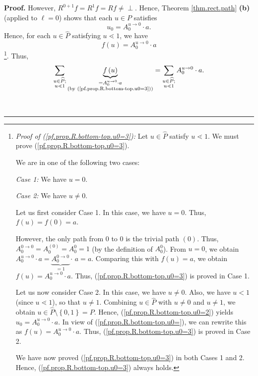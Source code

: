 \documentclass[numbers=enddot,12pt,final,onecolumn,notitlepage]{scrartcl}%
\theoremstyle{definition}
\newenvironment{verlong}{}{}
\newcommand{\undf}{\operatorname*{\bot}}
\newcommand{\downslack}{A}
\newenvironment{proof}[1][Proof]{\noindent\textbf{#1.} }{\ \rule{0.5em}{0.5em}}
\let\sumnonlimits\sum
\renewcommand{\sum}{\sumnonlimits\limits}
\begin{document}
\begin{verlong}
\begin{proof}
However, $R^{0+1}f=R^{1}f=Rf\neq\undf$. Hence, Theorem \ref{thm.rect.path}
\textbf{(b)} (applied to $\ell=0$) shows that each $u\in P$ satisfies%
\begin{equation}
u_{0}=\downslack_{0}^{u\rightarrow0}\cdot a. \label{pf.prop.R.bottom-top.u0=2}%
\end{equation}
Hence, for each $u\in\widehat{P}$ satisfying $u\lessdot1$, we have%
\begin{equation}
f\left(  u\right)  =\downslack_{0}^{u\rightarrow0}\cdot a
\label{pf.prop.R.bottom-top.u0=3}%
\end{equation}
\footnote{\textit{Proof of (\ref{pf.prop.R.bottom-top.u0=3}):} Let
$u\in\widehat{P}$ satisfy $u\lessdot1$. We must prove
(\ref{pf.prop.R.bottom-top.u0=3}).
\par
We are in one of the following two cases:
\par
\textit{Case 1:} We have $u=0$.
\par
\textit{Case 2:} We have $u\neq0$.
\par
Let us first consider Case 1. In this case, we have $u=0$. Thus, $f\left(
u\right)  =f\left(  0\right)  =a$.
\par
However, the only path from $0$ to $0$ is the trivial path $\left(  0\right)
$. Thus, $\downslack_{0}^{0\rightarrow0}=\downslack_{0}^{\left(  0\right)
}=\downslack_{0}^{0}=1$ (by the definition of $\downslack_{0}^{0}$). From
$u=0$, we obtain $\downslack_{0}^{u\rightarrow0}\cdot
a=\underbrace{\downslack_{0}^{0\rightarrow0}}_{=1}\cdot\, a=a$. Comparing this
with $f\left(  u\right)  =a$, we obtain $f\left(  u\right)  =\downslack_{0}%
^{u\rightarrow0}\cdot a$. Thus, (\ref{pf.prop.R.bottom-top.u0=3}) is proved in
Case 1.
\par
Let us now consider Case 2. In this case, we have $u\neq0$. Also, we have
$u<1$ (since $u\lessdot1$), so that $u\neq1$. Combining $u\in\widehat{P}$ with
$u\neq0$ and $u\neq1$, we obtain $u\in\widehat{P}\setminus\left\{
0,1\right\}  =P$. Hence, (\ref{pf.prop.R.bottom-top.u0=2}) yields
$u_{0}=\downslack_{0}^{u\rightarrow0}\cdot a$. In view of
(\ref{pf.prop.R.bottom-top.u0=}), we can rewrite this as $f\left(  u\right)
=\downslack_{0}^{u\rightarrow0}\cdot a$. Thus,
(\ref{pf.prop.R.bottom-top.u0=3}) is proved in Case 2.
\par
We have now proved (\ref{pf.prop.R.bottom-top.u0=3}) in both Cases 1 and 2.
Hence, (\ref{pf.prop.R.bottom-top.u0=3}) always holds.}. Thus,%
\begin{equation}
\sum_{\substack{u\in\widehat{P};\\u\lessdot1}}\underbrace{f\left(  u\right)
}_{\substack{=\downslack_{0}^{u\rightarrow0}\cdot a\\\text{(by
(\ref{pf.prop.R.bottom-top.u0=3}))}}}=\sum_{\substack{u\in\widehat{P}%
;\\u\lessdot1}}\downslack_{0}^{u\rightarrow0}\cdot a.
\label{pf.prop.R.bottom-top.8}%
\end{equation}



\end{proof}
\end{verlong}
\end{document}
